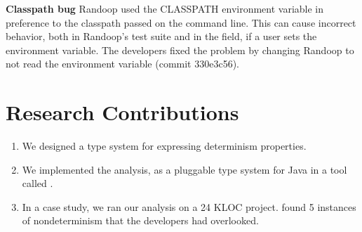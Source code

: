     \textbf{Classpath bug}
    Randoop used the CLASSPATH environment variable in preference to the
    classpath passed on the command line.
    This can cause incorrect behavior, both in Randoop's test suite and in the field,
    if a user sets the environment variable.
    The developers fixed the problem by changing Randoop to not read the environment variable
    (commit 330e3c56).


\section{Research Contributions\label{sec:contributions}}
\begin{enumerate}
  \item We designed a type system for expressing determinism properties.

  \item We implemented the analysis, as a pluggable type system for Java in a
    tool called \theDeterminismChecker.

  \item In a case study, we ran our analysis on a 24 KLOC project.
    \TheDeterminismChecker
    found 5 instances of nondeterminism that the developers had
    overlooked.
\end{enumerate}


